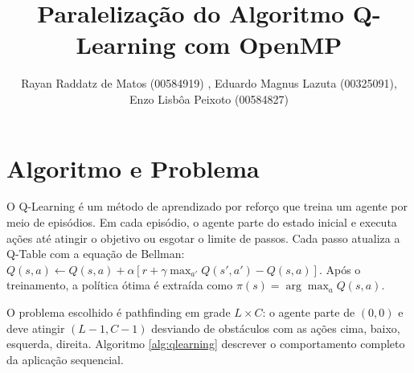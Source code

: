 \documentclass[12pt]{article}
\date{}
\title{Paralelização do Algoritmo Q-Learning com OpenMP}
\begin{document}
\author{
   Rayan Raddatz de Matos (00584919) ,
   Eduardo Magnus Lazuta (00325091), \\
   Enzo Lisbôa Peixoto (00584827)}

\address{
   Instituto de Informática, Universidade Federal do Rio Grande do Sul (UFRGS)\\
   Caixa Postal 15.064 -- 91.501-970 -- Porto Alegre -- RS -- Brazil
}

\maketitle
\section{Algoritmo e Problema}
\label{sec:orgcfa6d99}

O Q-Learning é um método de aprendizado por reforço que treina um
agente por meio de episódios. Em cada episódio, o agente parte do
estado inicial e executa ações até atingir o objetivo ou esgotar o
limite de passos. Cada passo atualiza a Q-Table com a equação de
Bellman: \(Q(s,a) \leftarrow Q(s,a) + \alpha[r + \gamma \max_{a'}
Q(s',a') - Q(s,a)]\). Após o treinamento, a política ótima é extraída
como \(\pi(s) = \arg\max_a Q(s,a)\).

O problema escolhido é pathfinding em grade \(L \times C\): o agente parte de
\((0,0)\) e deve atingir \((L{-}1,C{-}1)\) desviando de obstáculos com as
ações cima, baixo, esquerda, direita. Algoritmo \ref{alg:qlearning}
descrever o comportamento completo da aplicação sequencial.
\end{document}
